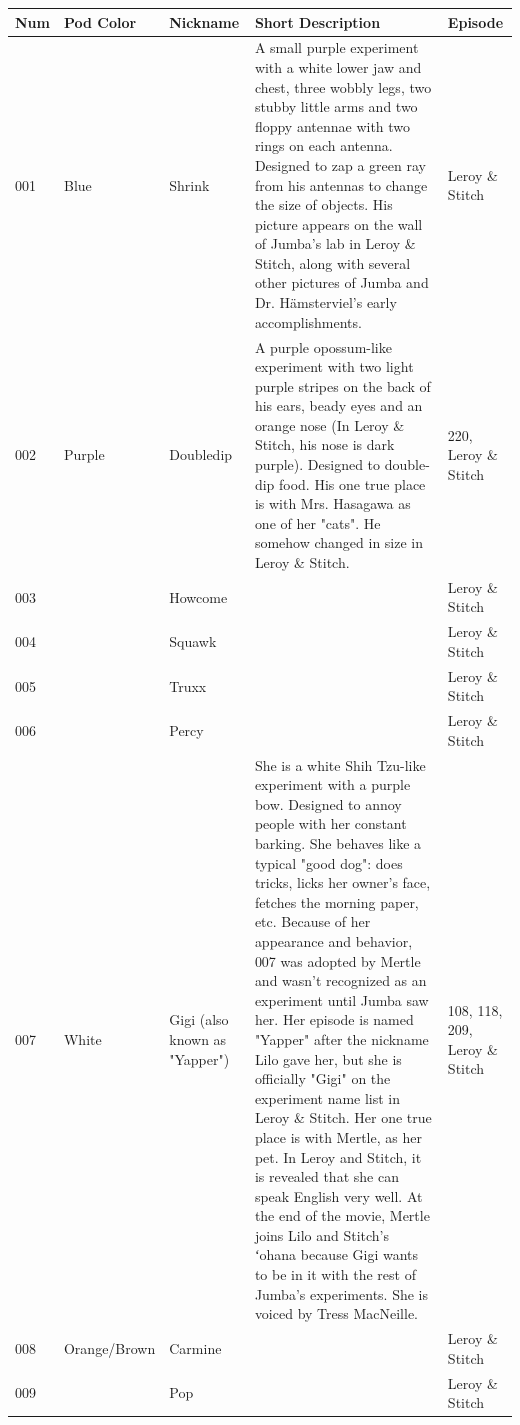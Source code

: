\documentclass{article}
\begin{document}
\begin{tabular}{lllll}
\toprule
Num & Pod Color & Nickname & Short Description & Episode \\
\midrule
001 & Blue & Shrink & A small purple experiment with a white lower jaw and chest, three wobbly legs, two stubby little arms and two floppy antennae with two rings on each antenna. Designed to zap a green ray from his antennas to change the size of objects. His picture appears on the wall of Jumba's lab in Leroy \& Stitch, along with several other pictures of Jumba and Dr. Hämsterviel's early accomplishments. & Leroy \& Stitch \\
002 & Purple & Doubledip & A purple opossum-like experiment with two light purple stripes on the back of his ears, beady eyes and an orange nose (In Leroy \& Stitch, his nose is dark purple). Designed to double-dip food. His one true place is with Mrs. Hasagawa as one of her "cats". He somehow changed in size in Leroy \& Stitch. & 220, Leroy \& Stitch \\
003 &  & Howcome &  & Leroy \& Stitch \\
004 &  & Squawk &  & Leroy \& Stitch \\
005 &  & Truxx &  & Leroy \& Stitch \\
006 &  & Percy &  & Leroy \& Stitch \\
007 & White & Gigi (also known as "Yapper") & She is a white Shih Tzu-like experiment with a purple bow. Designed to annoy people with her constant barking. She behaves like a typical "good dog": does tricks, licks her owner's face, fetches the morning paper, etc. Because of her appearance and behavior, 007 was adopted by Mertle and wasn't recognized as an experiment until Jumba saw her. Her episode is named "Yapper" after the nickname Lilo gave her, but she is officially "Gigi" on the experiment name list in Leroy \& Stitch. Her one true place is with Mertle, as her pet. In Leroy and Stitch, it is revealed that she can speak English very well. At the end of the movie, Mertle joins Lilo and Stitch's ʻohana because Gigi wants to be in it with the rest of Jumba's experiments. She is voiced by Tress MacNeille. & 108, 118, 209, Leroy \& Stitch \\
008 & Orange/Brown & Carmine &  & Leroy \& Stitch \\
009 &  & Pop &  & Leroy \& Stitch \\

\end{tabular}
\end{document}
